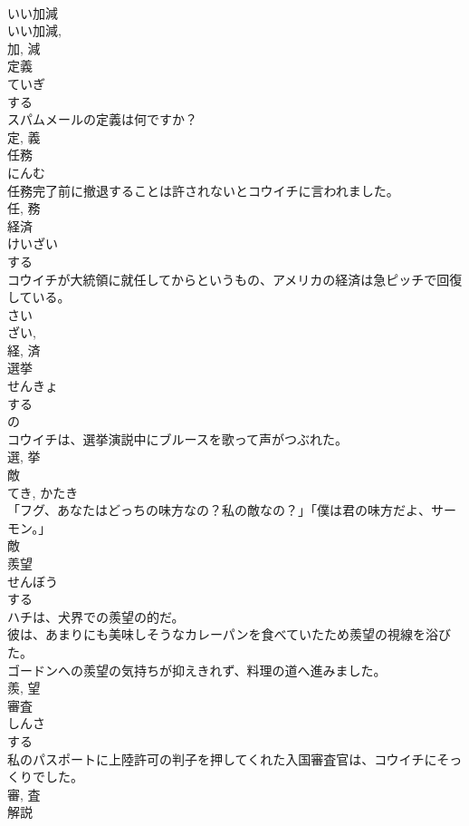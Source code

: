 \documentclass[8pt]{extreport}
\begin{document}
\begin{CJK}{UTF8}{min}
\\	いい加減 
\\	いい加減, 
\\	加, 減	
\\	定義	
\\	ていぎ	
\\	する 
\\	スパムメールの定義は何ですか？	
\\	定, 義	
\\	任務	
\\	にんむ	
\\	任務完了前に撤退することは許されないとコウイチに言われました。	
\\	任, 務	
\\	経済	
\\	けいざい	
\\	する 
\\	コウイチが大統領に就任してからというもの、アメリカの経済は急ピッチで回復している。	
\\	さい 
\\	ざい, 
\\	経, 済	
\\	選挙	
\\	せんきょ	
\\	する 
\\	の 
\\	コウイチは、選挙演説中にブルースを歌って声がつぶれた。	
\\	選, 挙	
\\	敵	
\\	てき, かたき	
\\	「フグ、あなたはどっちの味方なの？私の敵なの？」「僕は君の味方だよ、サーモン。」	
\\	敵	
\\	羨望	
\\	せんぼう	
\\	する 
\\	ハチは、犬界での羨望の的だ。	
\\	彼は、あまりにも美味しそうなカレーパンを食べていたため羨望の視線を浴びた。	
\\	ゴードンへの羨望の気持ちが抑えきれず、料理の道へ進みました。	
\\	羨, 望	
\\	審査	
\\	しんさ	
\\	する 
\\	私のパスポートに上陸許可の判子を押してくれた入国審査官は、コウイチにそっくりでした。	
\\	審, 査	
\\	解説	

\end{CJK}
\end{document}
